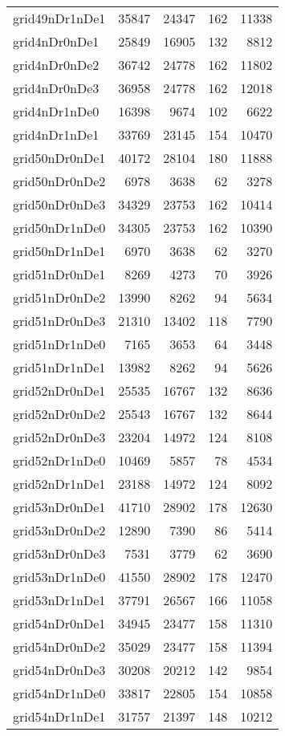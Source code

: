 \begin{longtable}{lrrrr}
grid49nDr1nDe1 & 35847 & 24347 & 162 & 11338 \\
grid4nDr0nDe1 & 25849 & 16905 & 132 & 8812 \\
grid4nDr0nDe2 & 36742 & 24778 & 162 & 11802 \\
grid4nDr0nDe3 & 36958 & 24778 & 162 & 12018 \\
grid4nDr1nDe0 & 16398 & 9674 & 102 & 6622 \\
grid4nDr1nDe1 & 33769 & 23145 & 154 & 10470 \\
grid50nDr0nDe1 & 40172 & 28104 & 180 & 11888 \\
grid50nDr0nDe2 & 6978 & 3638 & 62 & 3278 \\
grid50nDr0nDe3 & 34329 & 23753 & 162 & 10414 \\
grid50nDr1nDe0 & 34305 & 23753 & 162 & 10390 \\
grid50nDr1nDe1 & 6970 & 3638 & 62 & 3270 \\
grid51nDr0nDe1 & 8269 & 4273 & 70 & 3926 \\
grid51nDr0nDe2 & 13990 & 8262 & 94 & 5634 \\
grid51nDr0nDe3 & 21310 & 13402 & 118 & 7790 \\
grid51nDr1nDe0 & 7165 & 3653 & 64 & 3448 \\
grid51nDr1nDe1 & 13982 & 8262 & 94 & 5626 \\
grid52nDr0nDe1 & 25535 & 16767 & 132 & 8636 \\
grid52nDr0nDe2 & 25543 & 16767 & 132 & 8644 \\
grid52nDr0nDe3 & 23204 & 14972 & 124 & 8108 \\
grid52nDr1nDe0 & 10469 & 5857 & 78 & 4534 \\
grid52nDr1nDe1 & 23188 & 14972 & 124 & 8092 \\
grid53nDr0nDe1 & 41710 & 28902 & 178 & 12630 \\
grid53nDr0nDe2 & 12890 & 7390 & 86 & 5414 \\
grid53nDr0nDe3 & 7531 & 3779 & 62 & 3690 \\
grid53nDr1nDe0 & 41550 & 28902 & 178 & 12470 \\
grid53nDr1nDe1 & 37791 & 26567 & 166 & 11058 \\
grid54nDr0nDe1 & 34945 & 23477 & 158 & 11310 \\
grid54nDr0nDe2 & 35029 & 23477 & 158 & 11394 \\
grid54nDr0nDe3 & 30208 & 20212 & 142 & 9854 \\
grid54nDr1nDe0 & 33817 & 22805 & 154 & 10858 \\
grid54nDr1nDe1 & 31757 & 21397 & 148 & 10212 \\

\end{longtable}
